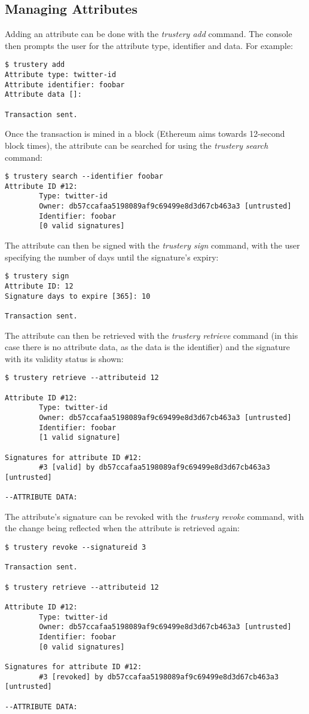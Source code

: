 \documentclass[12pt,a4paper]{report}
\begin{document}
	\subsection{Managing Attributes}
	Adding an attribute can be done with the \textit{trustery add} command. The console then prompts the user for the attribute type, identifier and data. For example:
	\begin{lstlisting}
$ trustery add
Attribute type: twitter-id
Attribute identifier: foobar
Attribute data []: 

Transaction sent.
	\end{lstlisting}
	Once the transaction is mined in a block (Ethereum aims towards 12-second block times\cite{23}), the attribute can be searched for using the \textit{trustery search} command:
	\begin{lstlisting}
$ trustery search --identifier foobar
Attribute ID #12:
        Type: twitter-id
        Owner: db57ccafaa5198089af9c69499e8d3d67cb463a3 [untrusted]
        Identifier: foobar
        [0 valid signatures]
	\end{lstlisting}
	The attribute can then be signed with the \textit{trustery sign} command, with the user specifying the number of days until the signature's expiry:
	\begin{lstlisting}
$ trustery sign
Attribute ID: 12
Signature days to expire [365]: 10

Transaction sent.
	\end{lstlisting}
	The attribute can then be retrieved with the \textit{trustery retrieve} command (in this case there is no attribute data, as the data is the identifier) and the signature with its validity status is shown:
	\begin{lstlisting}
$ trustery retrieve --attributeid 12

Attribute ID #12:
        Type: twitter-id
        Owner: db57ccafaa5198089af9c69499e8d3d67cb463a3 [untrusted]
        Identifier: foobar
        [1 valid signature]

Signatures for attribute ID #12:
        #3 [valid] by db57ccafaa5198089af9c69499e8d3d67cb463a3 [untrusted]

--ATTRIBUTE DATA:

	\end{lstlisting}
	The attribute's signature can be revoked with the \textit{trustery revoke} command, with the change being reflected when the attribute is retrieved again:
	\begin{lstlisting}
$ trustery revoke --signatureid 3

Transaction sent.

$ trustery retrieve --attributeid 12

Attribute ID #12:
        Type: twitter-id
        Owner: db57ccafaa5198089af9c69499e8d3d67cb463a3 [untrusted]
        Identifier: foobar
        [0 valid signatures]

Signatures for attribute ID #12:
        #3 [revoked] by db57ccafaa5198089af9c69499e8d3d67cb463a3 [untrusted]

--ATTRIBUTE DATA:

	\end{lstlisting}
	
\end{document}
